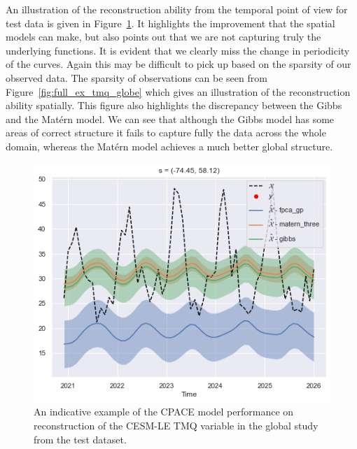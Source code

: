 An illustration of the reconstruction ability from the temporal point of view for test data is given in Figure~\ref{fig:test_ex_tmq_globe}.
It highlights the improvement that the spatial models can make, but also points out that we are not capturing truly the underlying functions.
It is evident that we clearly miss the change in periodicity of the curves.
Again this may be difficult to pick up based on the sparsity of our observed data.
The sparsity of observations can be seen from Figure~\ref{fig:full_ex_tmq_globe} which gives an illustration of the reconstruction ability spatially.
This figure also highlights the discrepancy between the Gibbs and the Mat\'ern model.
We can see that although the Gibbs model has some areas of correct structure it fails to capture fully the data across the whole domain, whereas the Mat\'ern model achieves a much better global structure.

\begin{figure}
	\centering
	\includegraphics[width=\textwidth]{test_ex_tmq_globe}
	\caption[An indicative example of the CPACE model performance on reconstruction of the CESM-LE TMQ variable in the global study from the test dataset.]{An indicative example of the CPACE model performance on reconstruction of the CESM-LE TMQ variable in the global study from the test dataset.}
	\label{fig:test_ex_tmq_globe}
\end{figure}

